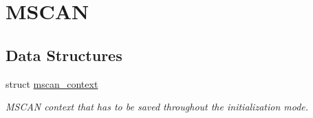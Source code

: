 \hypertarget{group__RTEMSBSPsPowerPCGen5200MSCAN}{}\section{M\+S\+C\+AN}
\label{group__RTEMSBSPsPowerPCGen5200MSCAN}
\subsection*{Data Structures}
\begin{DoxyCompactItemize}
\item 
struct \mbox{\hyperlink{structmscan__context}{mscan\+\_\+context}}
\begin{DoxyCompactList}\small\item\em M\+S\+C\+AN context that has to be saved throughout the initialization mode. \end{DoxyCompactList}\end{DoxyCompactItemize}
